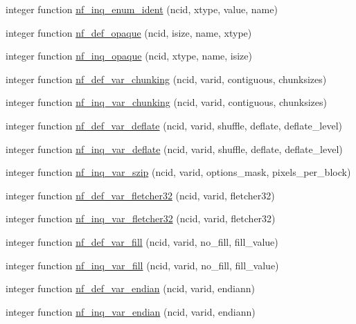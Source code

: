 \begin{DoxyCompactItemize}
integer function \hyperlink{nf__nc4_8f90_a2b63323d770247e1e5bd83f210ffe591}{nf\+\_\+inq\+\_\+enum\+\_\+ident} (ncid, xtype, value, name)
\item 
integer function \hyperlink{nf__nc4_8f90_ade841fe63e59aac378b8589dabbcd11e}{nf\+\_\+def\+\_\+opaque} (ncid, isize, name, xtype)
\item 
integer function \hyperlink{nf__nc4_8f90_ac2dd2b5127fdca24cd688fbaa6c0af3d}{nf\+\_\+inq\+\_\+opaque} (ncid, xtype, name, isize)
\item 
integer function \hyperlink{nf__nc4_8f90_a58c38d86fb28100f5c462eceafb54001}{nf\+\_\+def\+\_\+var\+\_\+chunking} (ncid, varid, contiguous, chunksizes)
\item 
integer function \hyperlink{nf__nc4_8f90_acd11410bbe5e09c4154ddd649c3e712c}{nf\+\_\+inq\+\_\+var\+\_\+chunking} (ncid, varid, contiguous, chunksizes)
\item 
integer function \hyperlink{nf__nc4_8f90_a134a9ce66ebe6114713e2a1b53b8fd5b}{nf\+\_\+def\+\_\+var\+\_\+deflate} (ncid, varid, shuffle, deflate, deflate\+\_\+level)
\item 
integer function \hyperlink{nf__nc4_8f90_aa85464177c4a586ebb4e25b1ca943746}{nf\+\_\+inq\+\_\+var\+\_\+deflate} (ncid, varid, shuffle, deflate, deflate\+\_\+level)
\item 
integer function \hyperlink{nf__nc4_8f90_a288dac8c47f0c45192ea050536ab4760}{nf\+\_\+inq\+\_\+var\+\_\+szip} (ncid, varid, options\+\_\+mask, pixels\+\_\+per\+\_\+block)
\item 
integer function \hyperlink{nf__nc4_8f90_acf968c8bc0861124e12b9efe97360d45}{nf\+\_\+def\+\_\+var\+\_\+fletcher32} (ncid, varid, fletcher32)
\item 
integer function \hyperlink{nf__nc4_8f90_ad55670c57d36c16ebc8507d55e680cd0}{nf\+\_\+inq\+\_\+var\+\_\+fletcher32} (ncid, varid, fletcher32)
\item 
integer function \hyperlink{nf__nc4_8f90_a104b90b25e029b9b2f5bcacd053ffc18}{nf\+\_\+def\+\_\+var\+\_\+fill} (ncid, varid, no\+\_\+fill, fill\+\_\+value)
\item 
integer function \hyperlink{nf__nc4_8f90_a07f7ebc6ed319dc9a1572ebe151daf2f}{nf\+\_\+inq\+\_\+var\+\_\+fill} (ncid, varid, no\+\_\+fill, fill\+\_\+value)
\item 
integer function \hyperlink{nf__nc4_8f90_a378de03b4286e054f0e58761bf3d9ee5}{nf\+\_\+def\+\_\+var\+\_\+endian} (ncid, varid, endiann)
\item 
integer function \hyperlink{nf__nc4_8f90_a8811fd80695b7334824133a0cd84b983}{nf\+\_\+inq\+\_\+var\+\_\+endian} (ncid, varid, endiann)

\end{DoxyCompactItemize}
